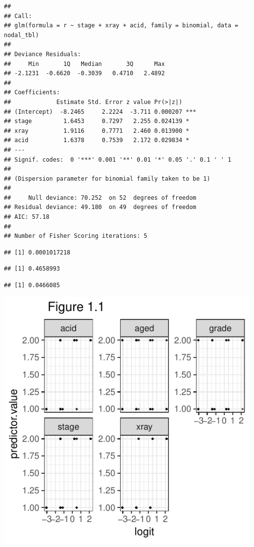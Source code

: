\documentclass[]{article}
\begin{document}
\begin{verbatim}
## 
## Call:
## glm(formula = r ~ stage + xray + acid, family = binomial, data = nodal_tbl)
## 
## Deviance Residuals: 
##     Min       1Q   Median       3Q      Max  
## -2.1231  -0.6620  -0.3039   0.4710   2.4892  
## 
## Coefficients:
##             Estimate Std. Error z value Pr(>|z|)    
## (Intercept)  -8.2465     2.2224  -3.711 0.000207 ***
## stage         1.6453     0.7297   2.255 0.024139 *  
## xray          1.9116     0.7771   2.460 0.013900 *  
## acid          1.6378     0.7539   2.172 0.029834 *  
## ---
## Signif. codes:  0 '***' 0.001 '**' 0.01 '*' 0.05 '.' 0.1 ' ' 1
## 
## (Dispersion parameter for binomial family taken to be 1)
## 
##     Null deviance: 70.252  on 52  degrees of freedom
## Residual deviance: 49.180  on 49  degrees of freedom
## AIC: 57.18
## 
## Number of Fisher Scoring iterations: 5
\end{verbatim}

\begin{verbatim}
## [1] 0.0001017218
\end{verbatim}

\begin{verbatim}
## [1] 0.4658993
\end{verbatim}

\begin{verbatim}
## [1] 0.0466085
\end{verbatim}

\includegraphics{a2_files/figure-latex/unnamed-chunk-6-1.pdf}
\end{document}
